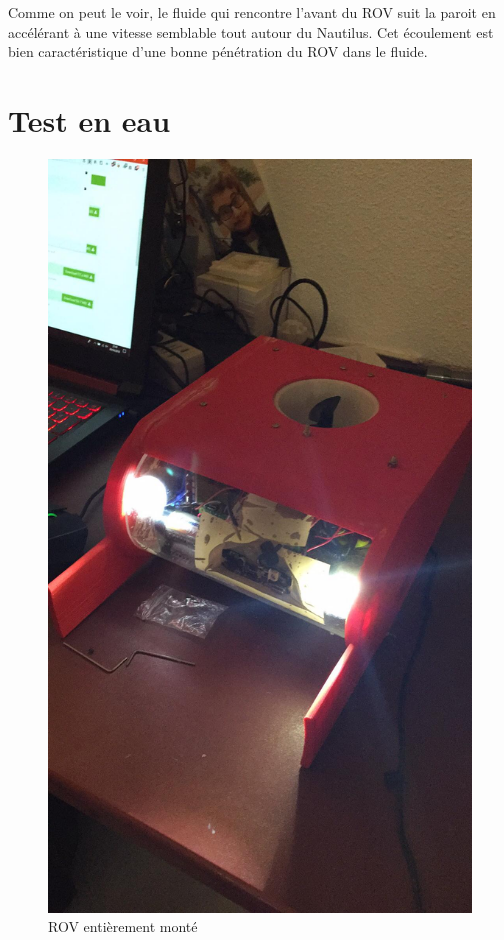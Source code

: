 \documentclass[a4paper,11pt]{report}
\begin{document}
					
				Comme on peut le voir, le fluide qui rencontre l'avant du ROV suit la paroit en accélérant à une vitesse semblable tout autour du Nautilus. Cet écoulement est bien caractéristique d'une bonne pénétration du ROV dans le fluide.\newpage
				
				\section{Test en eau}
				
				\begin{figure}[!h]
					\begin{center}
						\includegraphics[scale=0.1]{Photos/Capture24.jpeg}
						\caption{ROV entièrement monté}
					\end{center}
				\end{figure}
				\newline
				
\end{document}
